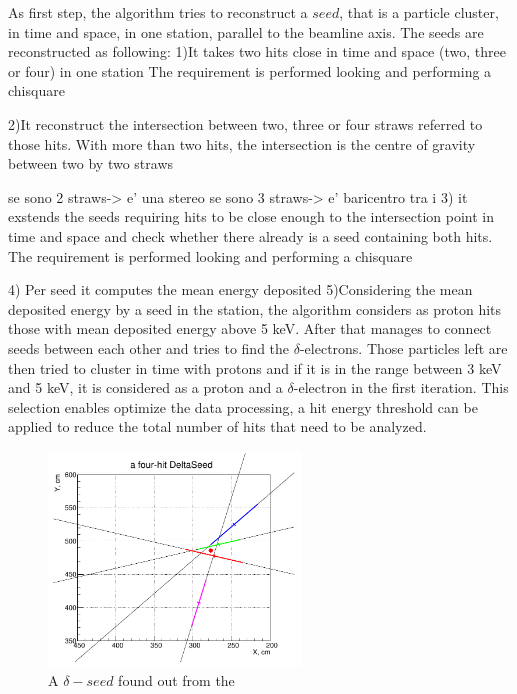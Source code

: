 As first step, the algorithm tries to reconstruct a $seed$, that is 
a particle cluster, in time and space, in one station, parallel 
to the beamline axis. 
The seeds are reconstructed as following:
1)It takes two hits close in time and space (two, three or four) 
in one station
The requirement is performed looking and performing a chisquare

2)It reconstruct the intersection between two, 
three or four straws referred to those hits.
With more than two hits, the intersection is the centre of gravity between 
two by two straws

se sono 2 straws-> e' una stereo
se sono 3 straws-> e' baricentro tra i 
3) it exstends the seeds requiring hits to be close 
enough to the intersection point in time and space and check whether 
there already is a seed containing both hits.
The requirement is performed looking and performing a chisquare

4) Per seed it computes the mean energy deposited
5)Considering the mean deposited energy by a seed in the station, 
the algorithm considers as proton 
hits those with mean deposited energy above 5 keV. 
After that manages to connect seeds between each other and tries to find 
the $\delta$-electrons. 
Those particles left are then tried to cluster in time with protons 
and if it is in the range between 3 keV and 5 keV, it is considered 
as a proton and a $\delta$-electron in the first iteration. 
This selection enables optimize the data 
processing, a hit energy threshold can be 
applied to reduce the total number of hits that need to be analyzed. 
\begin{figure}[!h]
    \centering
    \includegraphics[width =0.6\textwidth]{figures/png/Screenshot_20240811_115854.png}
    \caption[$\delta-seed$s from $StrawHit$s.]{A $\delta-seed$ found out from the    }
    \label{fig:deltaseeds}
\end{figure}
